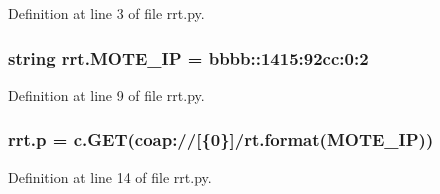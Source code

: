 Definition at line 3 of file rrt.\+py.

\subsubsection[{\texorpdfstring{M\+O\+T\+E\+\_\+\+IP}{MOTE_IP}}]{\setlength{\rightskip}{0pt plus 5cm}string rrt.\+M\+O\+T\+E\+\_\+\+IP = \textquotesingle{}bbbb\+::1415\+:92cc\+:0\+:2\textquotesingle{}}\hypertarget{namespacerrt_a102ccddafd78c2e5a9a7bd61e59c662b}{}\label{namespacerrt_a102ccddafd78c2e5a9a7bd61e59c662b}


Definition at line 9 of file rrt.\+py.

\subsubsection[{\texorpdfstring{p}{p}}]{\setlength{\rightskip}{0pt plus 5cm}rrt.\+p = c.\+G\+ET(\textquotesingle{}coap\+://\mbox{[}\{0\}\mbox{]}/rt\textquotesingle{}.format({\bf M\+O\+T\+E\+\_\+\+IP}))}\hypertarget{namespacerrt_aea6bdc9d2a9d99a8c839b237ec0e344a}{}\label{namespacerrt_aea6bdc9d2a9d99a8c839b237ec0e344a}


Definition at line 14 of file rrt.\+py.

